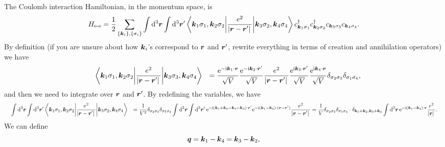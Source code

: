 \documentclass[hyperref, a4paper, 12pt]{report}
\newcommand*{\ii}{\mathrm{i}}
\newcommand*{\ee}{\mathrm{e}}
\def\\{}%
\begin{document}
The Coulomb interaction Hamiltonian, 
in the momentum space, is 
\begin{equation}
    H_{\text{e-e}} = \frac{1}{2} \sum_{\{\vb*{k}_i\}, \{\sigma_i\}} \int \dd[3]{\vb*{r}} \int \dd[3]{\vb*{r}'}
    \mel**{\vb*{k}_1 \sigma_1, \vb*{k}_2 \sigma_2}%
    {\frac{e^2}{\abs*{\vb*{r} - \vb*{r}'}}}%
    {\vb*{k}_3 \sigma_2, \vb*{k}_4 \sigma_4}
    c^\dagger_{\vb*{k}_1 \sigma_1} c^\dagger_{\vb*{k}_2 \sigma_2}
    c_{\vb*{k}_3 \sigma_3} c_{\vb*{k}_4 \sigma_4}.
\end{equation}
By definition (if you are unsure about how $\vb*{k}_i$'s correspond to $\vb*{r}$ and $\vb*{r}'$,
rewrite everything in terms of creation and annihilation operators)
we have 
\[
\begin{aligned}
    &\quad \mel**{\vb*{k}_1 \sigma_1, \vb*{k}_2 \sigma_2}%
    {\frac{e^2}{\abs*{\vb*{r} - \vb*{r}'}}}%
    {\vb*{k}_3 \sigma_3, \vb*{k}_4 \sigma_4} \\
    &= \frac{\ee^{- \ii \vb*{k}_1 \cdot \vb*{r}}}{\sqrt{V}}
    \frac{\ee^{- \ii \vb*{k}_2 \cdot \vb*{r}'}}{\sqrt{V}}
    \frac{e^2}{\abs*{\vb*{r} - \vb*{r}'}}
    \frac{\ee^{\ii \vb*{k}_3 \cdot \vb*{r}'}}{\sqrt{V}}
    \frac{\ee^{\ii \vb*{k}_4 \cdot \vb*{r}}}{\sqrt{V}} 
    \delta_{\sigma_2 \sigma_3} \delta_{\sigma_1 \sigma_4},
\end{aligned}
\]
and then we need to integrate over $\vb*{r}$ and $\vb*{r}'$.
By redefining the variables, 
we have 
\[
    \begin{aligned}
        &\quad \int \dd[3]{\vb*{r}} \int \dd[3]{\vb*{r}'}
        \mel**{\vb*{k}_1 \sigma_1, \vb*{k}_2 \sigma_2}%
         {\frac{e^2}{\abs*{\vb*{r} - \vb*{r}'}}}%
        {\vb*{k}_3 \sigma_2, \vb*{k}_4 \sigma_4} \\
        &= \frac{1}{V^2} \delta_{\sigma_2 \sigma_3} \delta_{\sigma_1 \sigma_4}
        \int \dd[3]{\vb*{r}} \int \dd[3]{\vb*{r}'}
        \ee^{- \ii (\vb*{k}_1 + \vb*{k}_2 - \vb*{k}_3 - \vb*{k}_4) \cdot \vb*{r}'}
        \ee^{- \ii (\vb*{k}_1 - \vb*{k}_4) \cdot (\vb*{r} - \vb*{r}')}
        \frac{e^2}{\abs*{\vb*{r} - \vb*{r}'}} \\
        &= \frac{1}{V} \delta_{\sigma_2 \sigma_3} \delta_{\sigma_1 \sigma_4}
        \cdot \delta_{\vb*{k}_1 + \vb*{k}_2, \vb*{k}_3 + \vb*{k}_4}
        \int \dd[3]{\vb*{r}} \ee^{- \ii (\vb*{k}_1 - \vb*{k}_4) \cdot \vb*{r}} \frac{e^2}{\abs*{\vb*{r}}} .
    \end{aligned}
\]
We can define 
\begin{equation}
    \vb*{q} = \vb*{k}_1 - \vb*{k}_4 = \vb*{k}_3 - \vb*{k}_2,
\end{equation}
\end{document}
